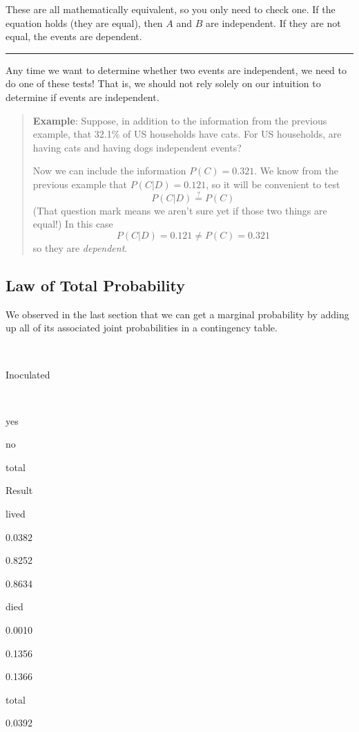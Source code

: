 \documentclass[
]{book}
\begin{document}
These are all mathematically equivalent, so you only need to check one. If the equation holds (they are equal), then \(A\) and \(B\) are independent. If they are not equal, the events are dependent.

\begin{center}\rule{0.5\linewidth}{0.5pt}\end{center}

Any time we want to determine whether two events are independent, we need to do one of these tests! That is, we should not rely solely on our intuition to determine if events are independent.

\begin{quote}
\textbf{Example}: Suppose, in addition to the information from the previous example, that 32.1\% of US households have cats. For US households, are having cats and having dogs independent events?

Now we can include the information \(P(C) = 0.321\). We know from the previous example that \(P(C|D) = 0.121\), so it will be convenient to test \[P(C|D) \stackrel{?}{=} P(C)\] (That question mark means we aren't sure yet if those two things are equal!) In this case \[ P(C|D) = 0.121 \ne P(C) = 0.321 \] so they are \emph{dependent}.
\end{quote}

\subsection{Law of Total Probability}\label{law-of-total-probability}

We observed in the last section that we can get a marginal probability by adding up all of its associated joint probabilities in a contingency table.

~

Inoculated

~

yes

no

total

Result

lived

0.0382

{0.8252}

{0.8634}

died

0.0010

0.1356

0.1366

total

{0.0392}
\end{document}
